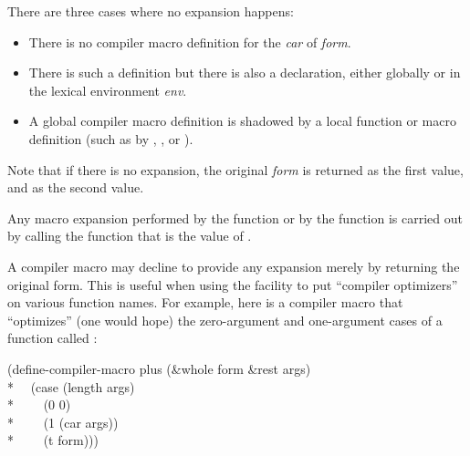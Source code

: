 \begin{newer}
\begin{defun}[Function]
  There are three cases where no expansion happens:
  \begin{itemize}
    \item There is no compiler macro definition for the {\it car} of {\it form}.
    \item There is such a definition but there is also a 
        declaration, either globally or in the lexical environment {\it env}.
    \item A global compiler macro definition is shadowed by a local
        function or macro definition (such as by , , or
        ).
  \end{itemize}
  Note that if there is no expansion, the original {\it form} is returned as
  the first value, and  as the second value.
  
  Any macro expansion performed by the function 
  or by the function  is carried out
  by calling the function that is the value of .

A compiler macro may decline to provide any expansion merely
by returning the original form. This is useful when using the facility
to put ``compiler optimizers'' on various function names.  For example,
here is a compiler macro that ``optimizes'' (one would hope)
the zero-argument and one-argument cases of
a function called :
\begin{lisp}
(define-compiler-macro plus (\&whole form \&rest args) \\*
~~(case (length args) \\*
~~~~(0 0) \\*
~~~~(1 (car args)) \\*
~~~~(t form)))
\end{lisp}
\end{defun}
\end{newer}



